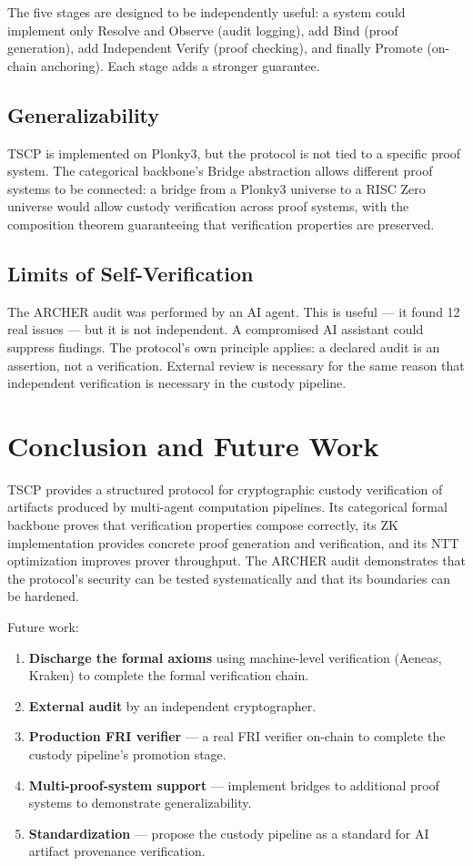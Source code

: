 \documentclass[11pt,a4paper]{article}
\begin{document}
The five stages are designed to be independently useful: a system could implement only Resolve and Observe (audit logging), add Bind (proof generation), add Independent Verify (proof checking), and finally Promote (on-chain anchoring). Each stage adds a stronger guarantee.

\subsection{Generalizability}

TSCP is implemented on Plonky3, but the protocol is not tied to a specific proof system. The categorical backbone's Bridge abstraction allows different proof systems to be connected: a bridge from a Plonky3 universe to a RISC Zero universe would allow custody verification across proof systems, with the composition theorem guaranteeing that verification properties are preserved.

\subsection{Limits of Self-Verification}

The ARCHER audit was performed by an AI agent. This is useful --- it found 12 real issues --- but it is not independent. A compromised AI assistant could suppress findings. The protocol's own principle applies: a declared audit is an assertion, not a verification. External review is necessary for the same reason that independent verification is necessary in the custody pipeline.

\section{Conclusion and Future Work}

TSCP provides a structured protocol for cryptographic custody verification of artifacts produced by multi-agent computation pipelines. Its categorical formal backbone proves that verification properties compose correctly, its ZK implementation provides concrete proof generation and verification, and its NTT optimization improves prover throughput. The ARCHER audit demonstrates that the protocol's security can be tested systematically and that its boundaries can be hardened.

Future work:
\begin{enumerate}
\item \textbf{Discharge the formal axioms} using machine-level verification (Aeneas, Kraken) to complete the formal verification chain.
\item \textbf{External audit} by an independent cryptographer.
\item \textbf{Production FRI verifier} --- a real FRI verifier on-chain to complete the custody pipeline's promotion stage.
\item \textbf{Multi-proof-system support} --- implement bridges to additional proof systems to demonstrate generalizability.
\item \textbf{Standardization} --- propose the custody pipeline as a standard for AI artifact provenance verification.
\end{enumerate}
\end{document}
